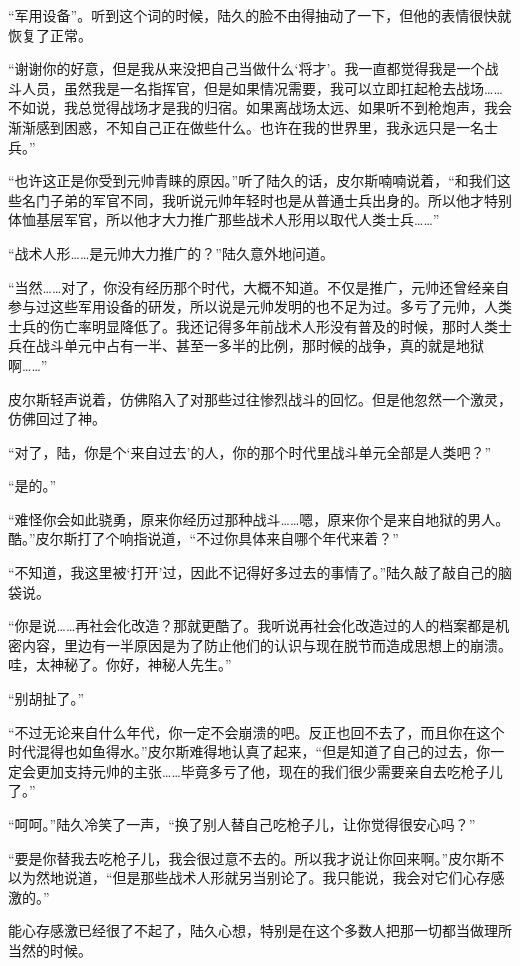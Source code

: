 “军用设备”。听到这个词的时候，陆久的脸不由得抽动了一下，但他的表情很快就恢复了正常。

“谢谢你的好意，但是我从来没把自己当做什么‘将才’。我一直都觉得我是一个战斗人员，虽然我是一名指挥官，但是如果情况需要，我可以立即扛起枪去战场……不如说，我总觉得战场才是我的归宿。如果离战场太远、如果听不到枪炮声，我会渐渐感到困惑，不知自己正在做些什么。也许在我的世界里，我永远只是一名士兵。”

“也许这正是你受到元帅青睐的原因。”听了陆久的话，皮尔斯喃喃说着，“和我们这些名门子弟的军官不同，我听说元帅年轻时也是从普通士兵出身的。所以他才特别体恤基层军官，所以他才大力推广那些战术人形用以取代人类士兵……”

“战术人形……是元帅大力推广的？”陆久意外地问道。

“当然……对了，你没有经历那个时代，大概不知道。不仅是推广，元帅还曾经亲自参与过这些军用设备的研发，所以说是元帅发明的也不足为过。多亏了元帅，人类士兵的伤亡率明显降低了。我还记得多年前战术人形没有普及的时候，那时人类士兵在战斗单元中占有一半、甚至一多半的比例，那时候的战争，真的就是地狱啊……”

皮尔斯轻声说着，仿佛陷入了对那些过往惨烈战斗的回忆。但是他忽然一个激灵，仿佛回过了神。

“对了，陆，你是个‘来自过去’的人，你的那个时代里战斗单元全部是人类吧？”

“是的。”

“难怪你会如此骁勇，原来你经历过那种战斗……嗯，原来你个是来自地狱的男人。酷。”皮尔斯打了个响指说道，“不过你具体来自哪个年代来着？”

“不知道，我这里被‘打开’过，因此不记得好多过去的事情了。”陆久敲了敲自己的脑袋说。

“你是说……再社会化改造？那就更酷了。我听说再社会化改造过的人的档案都是机密内容，里边有一半原因是为了防止他们的认识与现在脱节而造成思想上的崩溃。哇，太神秘了。你好，神秘人先生。”

“别胡扯了。”

“不过无论来自什么年代，你一定不会崩溃的吧。反正也回不去了，而且你在这个时代混得也如鱼得水。”皮尔斯难得地认真了起来，“但是知道了自己的过去，你一定会更加支持元帅的主张……毕竟多亏了他，现在的我们很少需要亲自去吃枪子儿了。”

“呵呵。”陆久冷笑了一声，“换了别人替自己吃枪子儿，让你觉得很安心吗？”

“要是你替我去吃枪子儿，我会很过意不去的。所以我才说让你回来啊。”皮尔斯不以为然地说道，“但是那些战术人形就另当别论了。我只能说，我会对它们心存感激的。”

能心存感激已经很了不起了，陆久心想，特别是在这个多数人把那一切都当做理所当然的时候。

